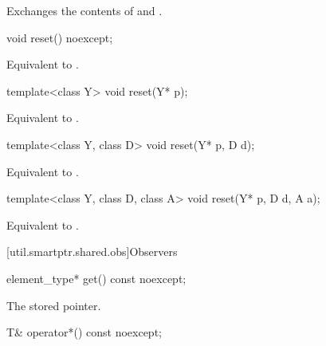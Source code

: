 \begin{itemdescr}

\pnum
\effects
Exchanges the contents of  and .
\end{itemdescr}

%
\begin{itemdecl}
void reset() noexcept;
\end{itemdecl}

\begin{itemdescr}
\pnum
\effects
Equivalent to .
\end{itemdescr}

%
\begin{itemdecl}
template<class Y> void reset(Y* p);
\end{itemdecl}

\begin{itemdescr}
\pnum
\effects
Equivalent to .
\end{itemdescr}

%
\begin{itemdecl}
template<class Y, class D> void reset(Y* p, D d);
\end{itemdecl}

\begin{itemdescr}
\pnum
\effects
Equivalent to .
\end{itemdescr}

%
\begin{itemdecl}
template<class Y, class D, class A> void reset(Y* p, D d, A a);
\end{itemdecl}

\begin{itemdescr}
\pnum
\effects
Equivalent to .
\end{itemdescr}

[util.smartptr.shared.obs]{Observers}
%
\begin{itemdecl}
element_type* get() const noexcept;
\end{itemdecl}

\begin{itemdescr}
\pnum
\returns
The stored pointer.
\end{itemdescr}

%
\begin{itemdecl}
T& operator*() const noexcept;
\end{itemdecl}

